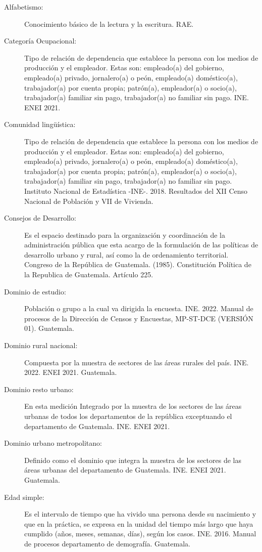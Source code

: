 \begin{description}
	\item[Alfabetismo:] Conocimiento básico de la lectura y la escritura. RAE.
	\item [Categoría Ocupacional:] Tipo de relación de dependencia que establece la persona con los medios de producción y el empleador. Estas son: empleado(a) del gobierno, empleado(a) privado, jornalero(a) o peón, empleado(a) doméstico(a), trabajador(a) por cuenta propia; patrón(a), empleador(a) o socio(a), trabajador(a) familiar sin pago, trabajador(a) no familiar sin pago. INE. ENEI 2021.
	\item[Comunidad lingüística:] Tipo de relación de dependencia que establece la persona con los medios de producción y el empleador. Estas son: empleado(a) del gobierno, empleado(a) privado, jornalero(a) o peón, empleado(a) doméstico(a), trabajador(a) por cuenta propia; patrón(a), empleador(a) o socio(a), trabajador(a) familiar sin pago, trabajador(a) no familiar sin pago. Instituto Nacional de Estadística -INE-. 2018. Resultados del XII Censo Nacional de Población y VII de Vivienda.
	\item[Consejos de Desarrollo:] Es el espacio destinado para la organización y coordinación de la administración pública que esta acargo de la formulación de las políticas de desarrollo urbano y rural, así como la de ordenamiento territorial. Congreso de la República de Guatemala. (1985). Constitución Política de la Republica de Guatemala. Artículo 225.
	\item[Dominio de estudio:] Población o grupo a la cual va dirigida la encuesta. INE. 2022. Manual de procesos de la Dirección de Censos y Encuestas, MP-ST-DCE (VERSIÓN 01). Guatemala.
	\item[Dominio rural nacional:] Compuesta por la muestra de sectores de las áreas rurales del país. INE. 2022. ENEI 2021. Guatemala.
	\item[Dominio resto urbano:] En esta medición Integrado por la muestra de los sectores de las áreas urbanas de todos los departamentos de la república exceptuando el departamento de Guatemala. INE. ENEI 2021.
	\item[Dominio urbano metropolitano:] Definido como el dominio que integra la muestra de los sectores de las áreas urbanas del departamento de Guatemala. INE. ENEI 2021. Guatemala.
	\item[Edad simple:] Es el intervalo de tiempo que ha vivido una persona desde su nacimiento y que en la práctica, se expresa en la unidad del tiempo más largo que haya cumplido (años, meses, semanas, días), según los casos. INE. 2016. Manual de procesos departamento de demografía. Guatemala.

\end{description}
